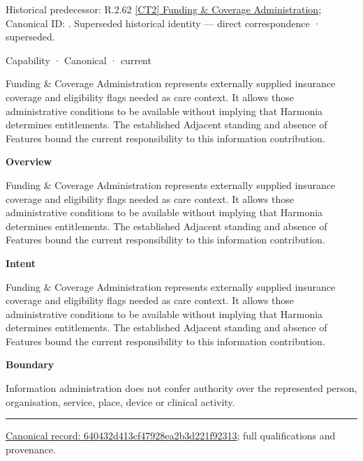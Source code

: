 {\small Historical predecessor: R.2.62 \hyperref[element:58beafcbcd084331be710eb00d27f6cf]{[CT2] Funding \& Coverage Administration}; Canonical ID: \texttt{}. Superseded historical identity — direct correspondence · superseded.}\par
\label{element:640432d413cf47928ea2b3d221f92313}
{\small Capability · Canonical · current}\par

Funding \& Coverage Administration represents externally supplied insurance coverage and eligibility flags needed as care context. It allows those administrative conditions to be available without implying that Harmonia determines entitlements. The established Adjacent standing and absence of Features bound the current responsibility to this information contribution.



\textbf{Overview}



Funding \& Coverage Administration represents externally supplied insurance coverage and eligibility flags needed as care context. It allows those administrative conditions to be available without implying that Harmonia determines entitlements. The established Adjacent standing and absence of Features bound the current responsibility to this information contribution.



\textbf{Intent}



Funding \& Coverage Administration represents externally supplied insurance coverage and eligibility flags needed as care context. It allows those administrative conditions to be available without implying that Harmonia determines entitlements. The established Adjacent standing and absence of Features bound the current responsibility to this information contribution.



\textbf{Boundary}



Information administration does not confer authority over the represented person, organisation, service, place, device or clinical activity.



\medskip\hrule\medskip

{\footnotesize \href{../../../../continuum/strategy/capability/640432d413cf47928ea2b3d221f92313.md}{Canonical record: 640432d413cf47928ea2b3d221f92313}; full qualifications and provenance.}\par
